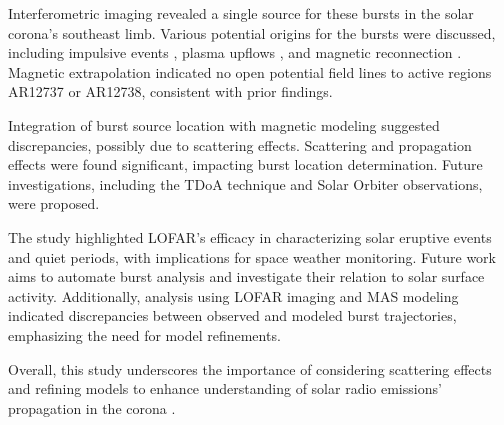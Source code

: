 Interferometric imaging revealed a single source for these bursts in the solar corona's southeast limb. Various potential origins for the bursts were discussed, including impulsive events \citep{ishikawa_2017, che_2018, chhabra_2021}, plasma upflows \citep{harra_2021}, and magnetic reconnection \citep{gopalswamy_2022}. Magnetic extrapolation indicated no open potential field lines to active regions AR12737 or AR12738, consistent with prior findings.

Integration of burst source location with magnetic modeling suggested discrepancies, possibly due to scattering effects. Scattering and propagation effects were found significant, impacting burst location determination. Future investigations, including the TDoA technique and Solar Orbiter observations, were proposed.

The study highlighted LOFAR's efficacy in characterizing solar eruptive events and quiet periods, with implications for space weather monitoring. Future work aims to automate burst analysis and investigate their relation to solar surface activity.
Additionally, analysis using LOFAR imaging and MAS modeling indicated discrepancies between observed and modeled burst trajectories, emphasizing the need for model refinements.

Overall, this study underscores the importance of considering scattering effects and refining models to enhance understanding of solar radio emissions' propagation in the corona \citep{kontar_2019, kontar_2023, chen_2023}.